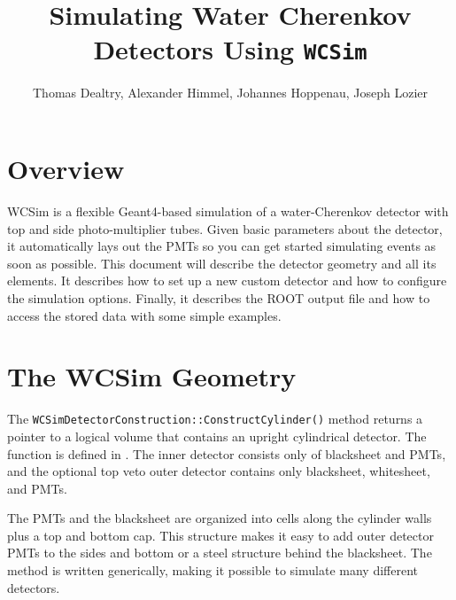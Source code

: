 
\author{Thomas Dealtry, Alexander Himmel, Johannes Hoppenau, Joseph Lozier}
\title{Simulating Water Cherenkov Detectors Using \texttt{WCSim}}

\graphicspath{ {figures/} }


\maketitle
\tableofcontents


\section{Overview}

WCSim is a flexible Geant4-based simulation of a water-Cherenkov detector with top and side photo-multiplier tubes.  Given basic parameters about the detector, it automatically lays out the PMTs so you can get started simulating events as soon as possible.  This document will describe the detector geometry and all its elements.  It describes how to set up a new custom detector and how to configure the simulation options.  Finally, it describes the ROOT output file and how to access the stored data with some simple examples.


\section{The WCSim Geometry}
The \texttt{WCSimDetectorConstruction::ConstructCylinder()} method returns a pointer to a logical volume that contains an upright cylindrical detector. The function is defined in . The inner detector consists only of blacksheet and PMTs, and the optional top veto outer detector contains only blacksheet, whitesheet, and PMTs.

The PMTs and the blacksheet are organized into cells along the cylinder walls plus a top and bottom cap. This structure makes it easy to add outer detector PMTs to the sides and bottom or a steel structure behind the blacksheet. The method is written generically, making it possible to simulate many different detectors. 

